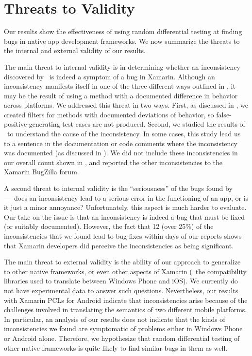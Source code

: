 \section{Threats to Validity}
\label{section:threats}

Our results show the effectiveness of using random differential testing at
finding bugs in native app development frameworks. We now summarize the threats
to the internal and external validity of our results.

The main threat to internal validity is in determining whether an inconsistency
discovered by \tool\ is indeed a symptom of a bug in Xamarin. Although an
inconsistency manifests itself in one of the three different ways outlined in
, it may be the result of using a method
with a documented difference in behavior across platforms. We addressed this
threat in two ways. First, as discussed in , we created
filters for methods with documented deviations of behavior, so
false-positive-generating test cases are not produced. Second, we studied the
results of \tool\ to understand the cause of the inconsistency. In some cases,
this study lead us to a sentence in the documentation or code comments where
the inconsistency was documented (as discussed in
). We did not include these inconsistencies in our
overall count shown in , and reported the other
inconsistencies to the Xamarin BugZilla forum.

A second threat to internal validity is the ``seriousness'' of the bugs found
by \tool---\ie~does an inconsistency lead to a serious error in the functioning
of an app, or is it just a minor annoyance? Unfortunately, this aspect is much
harder to evaluate. Our take on the issue is that an inconsistency is indeed a
bug that must be fixed (or suitably documented). However, the fact that 12
(over 25\%) of the inconsistencies that we found lead to bug-fixes within days
of our reports shows that Xamarin developers did perceive the inconsistencies
as being significant.

The main threat to external validity is the ability of our approach to
generalize to other native frameworks, or even other aspects of Xamarin
(\eg~the compatibility libraries used to translate between Windows Phone and
iOS). We currently do not have experimental data to answer such questions.
Nevertheless, our results with Xamarin PCLs for Android indicate that
inconsistencies arise because of the challenges involved in translating the
semantics of two different mobile platforms. In particular, an analysis of our
results does not indicate that the kinds of inconsistencies we found are
symptomatic of problems either in Windows Phone or Android alone. Therefore, we
hypothesize that random differential testing of other native frameworks is
quite likely to find similar bugs in them as well.
